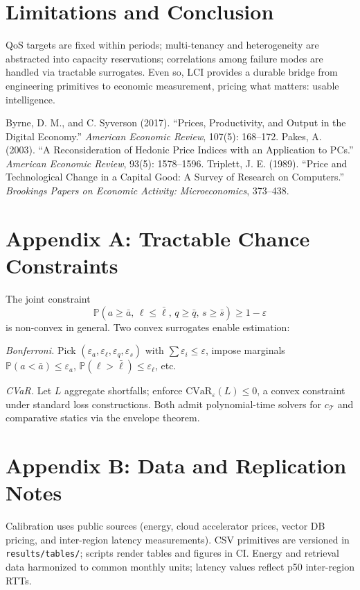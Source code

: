 \documentclass[12pt]{article}
\numberwithin{equation}{section}
\newcommand{\Prb}{\mathbb{P}}
\begin{document}
\section{Limitations and Conclusion}

QoS targets are fixed within periods; multi-tenancy and heterogeneity are abstracted into capacity reservations; correlations among failure modes are handled via tractable surrogates.  
Even so, LCI provides a durable bridge from engineering primitives to economic measurement, pricing what matters: usable intelligence.

\begin{thebibliography}{}
Byrne, D. M., and C. Syverson (2017). “Prices, Productivity, and Output in the Digital Economy.” \emph{American Economic Review}, 107(5): 168–172.
Pakes, A. (2003). “A Reconsideration of Hedonic Price Indices with an Application to PCs.” \emph{American Economic Review}, 93(5): 1578–1596.
Triplett, J. E. (1989). “Price and Technological Change in a Capital Good: A Survey of Research on Computers.” \emph{Brookings Papers on Economic Activity: Microeconomics}, 373–438.
\end{thebibliography}

\appendix

\section*{Appendix A: Tractable Chance Constraints}

The joint constraint
\[
\Prb\left(a\!\ge\!\bar a,\,\ell\!\le\!\bar\ell,\,q\!\ge\!\bar q,\,s\!\ge\!\bar s\right)\ge 1-\varepsilon
\]
is non-convex in general. Two convex surrogates enable estimation:

\emph{Bonferroni.} Pick $(\varepsilon_a,\varepsilon_\ell,\varepsilon_q,\varepsilon_s)$ with $\sum\varepsilon_i\le\varepsilon$, impose marginals $\Prb(a<\bar a)\le\varepsilon_a$, $\Prb(\ell>\bar\ell)\le\varepsilon_\ell$, etc.  

\emph{CVaR.} Let $L$ aggregate shortfalls; enforce $\mathrm{CVaR}_{\varepsilon}(L)\le 0$, a convex constraint under standard loss constructions.
Both admit polynomial-time solvers for $c_{\mathcal T}$ and comparative statics via the envelope theorem.

\section*{Appendix B: Data and Replication Notes}

Calibration uses public sources (energy, cloud accelerator prices, vector DB pricing, and inter-region latency measurements).  
CSV primitives are versioned in \texttt{results/tables/}; scripts render tables and figures in CI.  
Energy and retrieval data harmonized to common monthly units; latency values reflect p50 inter-region RTTs.
\end{document}
